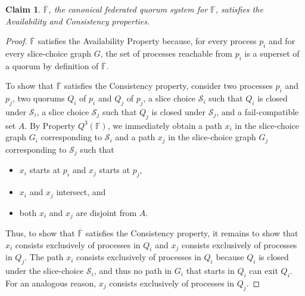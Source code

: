 \documentclass[11pt]{article}
\newtheorem{claim}{Claim}
\begin{document}
\begin{claim}
  \label{thm:canonical}
 $\overline{\mathbb{F}}$, the canonical federated quorum system for $\mathbb{F}$, satisfies the Availability and Consistency properties.
\end{claim}
\begin{proof}
  $\overline{\mathbb{F}}$ satisfies the Availability Property because, for every process $p_i$ and for every slice-choice graph $G$, the set of processes reachable from $p_i$ is a superset of a quorum by definition of $\overline{\mathbb{F}}$.


  To show that $\overline{\mathbb{F}}$ satisfies the Consistency property, consider two processes $p_i$ and $p_j$, two quorums $Q_i$ of $p_i$ and $Q_j$ of $p_j$, a slice choice $\mathcal{S}_i$ such that $Q_i$ is closed under $\mathcal{S}_i$, a slice choice $\mathcal{S}_j$ such that $Q_j$ is closed under $\mathcal{S}_j$, and a fail-compatible set $A$. By Property $Q^3(\mathbb{F})$, we immediately obtain a path $x_i$ in the slice-choice graph $G_i$ corresponding to $\mathcal{S}_i$ and a path $x_j$ in the slice-choice graph $G_j$ corresponding to $\mathcal{S}_j$ such that
    \begin{itemize}
      \item $x_i$ starts at $p_i$ and $x_j$ starts at $p_j$,
      \item $x_i$ and $x_j$ intersect, and
      \item both $x_i$ and $x_j$ are disjoint from $A$.
    \end{itemize}
    Thus, to show that $\overline{\mathbb{F}}$ satisfies the Consistency property, it remains to show that $x_i$ consists exclusively of processes in $Q_i$ and $x_j$ consists exclusively of processes in $Q_j$.
    The path $x_i$ consists exclusively of processes in $Q_i$ because $Q_i$ is closed under the slice-choice $\mathcal{S}_i$, and thus no path in $G_i$ that starts in $Q_i$ can exit $Q_i$.
    For an analogous reason, $x_j$ consists exclusively of processes in $Q_j$.
\end{proof}
\end{document}
